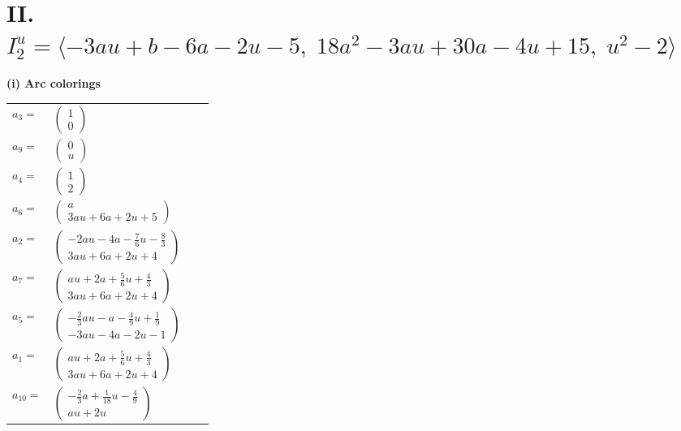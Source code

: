 \documentclass[1p]{elsarticle_modified}
\theoremstyle{definition}
\begin{document}
\centering \section*{II. $I^u_{2}= \langle -3 a u+b-6 a-2 u-5,\;18 a^2-3 a u+30 a-4 u+15,\;u^2-2 \rangle$}
\flushleft \textbf{(i) Arc colorings}\\
\begin{tabular}{m{7pt} m{180pt} m{7pt} m{180pt} }
\flushright $a_{3}=$&$\begin{pmatrix}1\\0\end{pmatrix}$ \\
\flushright $a_{9}=$&$\begin{pmatrix}0\\u\end{pmatrix}$ \\
\flushright $a_{4}=$&$\begin{pmatrix}1\\2\end{pmatrix}$ \\
\flushright $a_{6}=$&$\begin{pmatrix}a\\3 a u+6 a+2 u+5\end{pmatrix}$ \\
\flushright $a_{2}=$&$\begin{pmatrix}-2 a u-4 a-\frac{7}{6} u-\frac{8}{3}\\3 a u+6 a+2 u+4\end{pmatrix}$ \\
\flushright $a_{7}=$&$\begin{pmatrix}a u+2 a+\frac{5}{6} u+\frac{4}{3}\\3 a u+6 a+2 u+4\end{pmatrix}$ \\
\flushright $a_{5}=$&$\begin{pmatrix}-\frac{2}{3} a u- a-\frac{4}{9} u+\frac{1}{9}\\-3 a u-4 a-2 u-1\end{pmatrix}$ \\
\flushright $a_{1}=$&$\begin{pmatrix}a u+2 a+\frac{5}{6} u+\frac{4}{3}\\3 a u+6 a+2 u+4\end{pmatrix}$ \\
\flushright $a_{10}=$&$\begin{pmatrix}-\frac{2}{3} a+\frac{1}{18} u-\frac{4}{9}\\a u+2 u\end{pmatrix}$ \\

\end{tabular}
\end{document}

